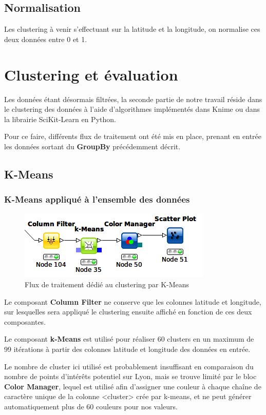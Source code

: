 \subsection{Normalisation}
Les clustering à venir s'effectuant sur la latitude et la longitude, on normalise ces deux données entre 0 et 1.
\pagebreak



\section{Clustering et évaluation}
Les données étant désormais filtrées, la seconde partie de notre travail réside dans le clustering des données à l'aide d'algorithmes implémentés dans Knime ou dans la librairie SciKit-Learn en Python.

Pour ce faire, différents flux de traitement ont été mis en place, prenant en entrée les données sortant du \textbf{GroupBy} précédemment décrit.

\subsection{K-Means}
\subsubsection{K-Means appliqué à l'ensemble des données}
\begin{figure}[H]
    \centering
    \includegraphics[width=0.5\linewidth]{img/knime_k-means_all.png}
    \caption{Flux de traitement dédié au clustering par K-Means}
\end{figure}

Le composant \textbf{Column Filter} ne conserve que les colonnes latitude et longitude, sur lesquelles sera appliqué le clustering ensuite affiché en fonction de ces deux composantes.

Le composant \textbf{k-Means} est utilisé pour réaliser 60 clusters en un maximum de 99 itérations à partir des colonnes latitude et longitude des données en entrée.

Le nombre de cluster ici utilisé est probablement insuffisant en comparaison du nombre de points d'intérêts potentiel sur Lyon, mais se trouve limité par le bloc \textbf{Color Manager}, lequel est utilisé afin d'assigner une couleur à chaque chaîne de caractère unique de la colonne <cluster> crée par k-means, et ne peut générer automatiquement plus de 60 couleurs pour nos valeurs.
\pagebreak

